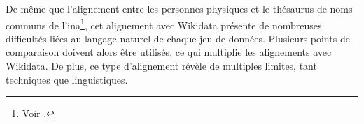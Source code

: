 De même que l'alignement entre les personnes physiques et le thésaurus de noms communs de l'\ac{ina}\footnote{Voir .}, cet alignement avec Wikidata présente de nombreuses difficultés liées au langage naturel de chaque jeu de données. Plusieurs points de comparaison doivent alors être utilisés, ce qui multiplie les alignements avec Wikidata. De plus, ce type d'alignement révèle de multiples limites, tant techniques que linguistiques.




